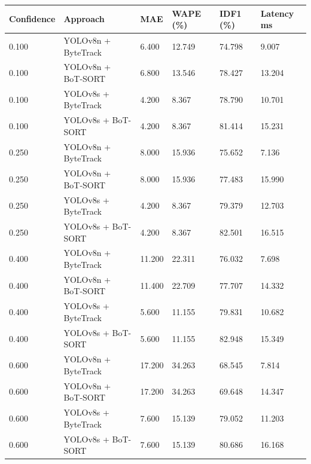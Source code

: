 \begin{tabular}{llllll}
\toprule
Confidence & Approach & MAE & WAPE (\%) & IDF1 (\%) & Latency ms \\
\midrule
0.100 & YOLOv8n + ByteTrack & 6.400 & 12.749 & 74.798 & 9.007 \\
0.100 & YOLOv8n + BoT-SORT & 6.800 & 13.546 & 78.427 & 13.204 \\
0.100 & YOLOv8s + ByteTrack & 4.200 & 8.367 & 78.790 & 10.701 \\
0.100 & YOLOv8s + BoT-SORT & 4.200 & 8.367 & 81.414 & 15.231 \\
0.250 & YOLOv8n + ByteTrack & 8.000 & 15.936 & 75.652 & 7.136 \\
0.250 & YOLOv8n + BoT-SORT & 8.000 & 15.936 & 77.483 & 15.990 \\
0.250 & YOLOv8s + ByteTrack & 4.200 & 8.367 & 79.379 & 12.703 \\
0.250 & YOLOv8s + BoT-SORT & 4.200 & 8.367 & 82.501 & 16.515 \\
0.400 & YOLOv8n + ByteTrack & 11.200 & 22.311 & 76.032 & 7.698 \\
0.400 & YOLOv8n + BoT-SORT & 11.400 & 22.709 & 77.707 & 14.332 \\
0.400 & YOLOv8s + ByteTrack & 5.600 & 11.155 & 79.831 & 10.682 \\
0.400 & YOLOv8s + BoT-SORT & 5.600 & 11.155 & 82.948 & 15.349 \\
0.600 & YOLOv8n + ByteTrack & 17.200 & 34.263 & 68.545 & 7.814 \\
0.600 & YOLOv8n + BoT-SORT & 17.200 & 34.263 & 69.648 & 14.347 \\
0.600 & YOLOv8s + ByteTrack & 7.600 & 15.139 & 79.052 & 11.203 \\
0.600 & YOLOv8s + BoT-SORT & 7.600 & 15.139 & 80.686 & 16.168 \\
\bottomrule
\end{tabular}

